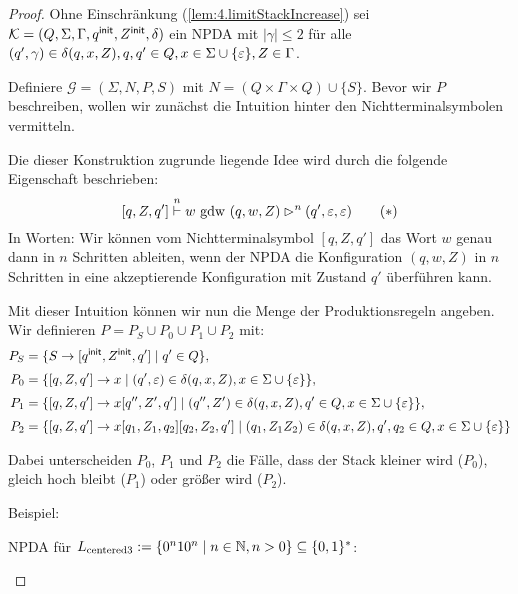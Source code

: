 \begin{proof}
 Ohne Einschränkung (\autoref{lem:4.limitStackIncrease}) sei $\mathcal{K} = (Q, \Sigma, \Gamma, \qinit, \Zinit, \delta)$ ein \ac{NPDA} mit $|\gamma| \le 2$ für alle $(q', \gamma) \in \delta(q, x, Z), q, q' \in Q, x \in \Sigma \cup \{\Eps\}, Z \in \Gamma$.

    Definiere $\mathcal{G} = (\Sigma, N, P, S)$ mit $N = (Q \times \Gamma \times Q) \cup \{S\}$.
    Bevor wir $P$ beschreiben, wollen wir zunächst die Intuition hinter den Nichtterminalsymbolen vermitteln.
        
    Die dieser Konstruktion zugrunde liegende Idee wird durch die folgende Eigenschaft beschrieben:
      \begin{equation}\label{eq:npdaToCfgProp}
        [q,Z,q']\stackrel{n}{\vdash} w \text{ gdw } (q,w,Z) \ConfRel^n (q',\Eps,\Eps) \tag{$*$}
      \end{equation}
    In Worten: Wir können vom Nichtterminalsymbol $[q,Z,q']$ das Wort $w$ genau dann in $n$ Schritten ableiten,
    wenn der \ac{NPDA} die Konfiguration $(q,w,Z)$ in $n$ Schritten in eine akzeptierende Konfiguration mit Zustand $q'$ überführen kann.
    
    Mit dieser Intuition können wir nun die Menge der Produktionsregeln angeben.
    Wir definieren $P=P_S\cup P_0\cup P_1\cup P_2$ mit:
    \begin{align*}
    P_S &= \{S \to [\qinit, \Zinit, q']\mid q'\in Q\}, \\[1mm]
    P_0 &= \{ [q, Z, q'] \to x \mid (q', \Eps)\in \delta(q, x, Z), x \in \Sigma \cup \{\Eps\} \}, \\[1mm]
    P_1 &= \{[q, Z, q'] \to x[q'', Z', q'] \mid (q'', Z')\in \delta(q, x, Z), q' \in Q, x \in \Sigma \cup \{\Eps\}\}, \\[1mm]
    P_2 &= \{[q, Z, q'] \to x[q_1,Z_1,q_2][q_2, Z_2, q'] \mid (q_1, Z_1Z_2)\in\delta(q, x, Z), q', q_2 \in Q, x \in \Sigma \cup \{\Eps\} \}
    \end{align*}
    
    Dabei unterscheiden $P_0$, $P_1$ und $P_2$ die Fälle, dass der Stack kleiner wird ($P_0$), gleich hoch bleibt ($P_1$) oder größer wird ($P_2$).
    
    Beispiel:
    
    \ac{NPDA} für $L_\text{centered3}:=\{0^n10^n \mid n\in\N, n > 0 \}\subseteq\{0,1\}^*$:
    
    \begin{center}
    \begin{tikzpicture}
 

\end{tikzpicture}
\end{center}
\end{proof}
